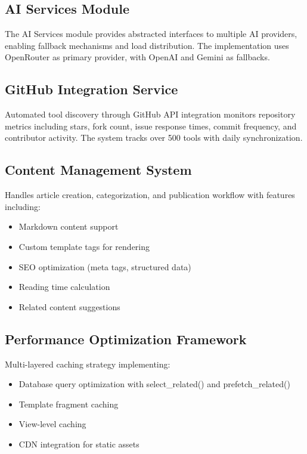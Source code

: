 \documentclass[conference]{IEEEtran}
\begin{document}
\subsection{AI Services Module}

The AI Services module provides abstracted interfaces to multiple AI providers, enabling fallback mechanisms and load distribution. The implementation uses OpenRouter as primary provider, with OpenAI and Gemini as fallbacks.

\subsection{GitHub Integration Service}

Automated tool discovery through GitHub API integration monitors repository metrics including stars, fork count, issue response times, commit frequency, and contributor activity. The system tracks over 500 tools with daily synchronization.

\subsection{Content Management System}

Handles article creation, categorization, and publication workflow with features including:
\begin{itemize}
    \item Markdown content support
    \item Custom template tags for rendering
    \item SEO optimization (meta tags, structured data)
    \item Reading time calculation
    \item Related content suggestions
\end{itemize}

\subsection{Performance Optimization Framework}

Multi-layered caching strategy implementing:
\begin{itemize}
    \item Database query optimization with select\_related() and prefetch\_related()
    \item Template fragment caching
    \item View-level caching
    \item CDN integration for static assets
\end{itemize}
\end{document}
